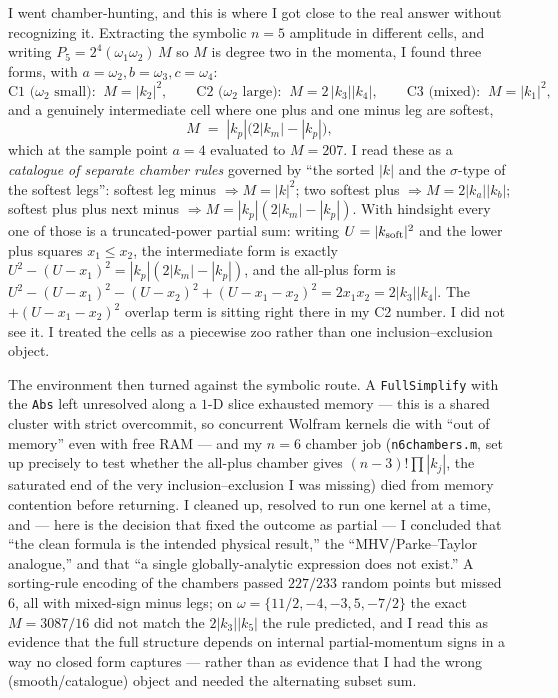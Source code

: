 \documentclass{article}
\begin{document}
I went chamber-hunting, and this is where I got close to the real answer without
recognizing it. Extracting the symbolic $n=5$ amplitude in different cells, and
writing $P_5=2^{4}(\omega_1\omega_2)\,M$ so $M$ is degree two in the momenta, I
found three forms, with $a=\omega_2,b=\omega_3,c=\omega_4$:
\[
\text{C1 ($\omega_2$ small):}\;\; M=|k_2|^2,\qquad
\text{C2 ($\omega_2$ large):}\;\; M=2\,|k_3||k_4|,\qquad
\text{C3 (mixed):}\;\; M=|k_1|^2,
\]
and a genuinely intermediate cell where one plus and one minus leg are softest,
\[
M \;=\; |k_p|\big(2|k_m|-|k_p|\big),
\]
which at the sample point $a=4$ evaluated to $M=207$. I read these as a
\emph{catalogue of separate chamber rules} governed by ``the sorted $|k|$ and the
$\sigma$-type of the softest legs'': softest leg minus $\Rightarrow M=|k|^2$; two
softest plus $\Rightarrow M=2|k_a||k_b|$; softest plus plus next minus
$\Rightarrow M=|k_p|(2|k_m|-|k_p|)$. With hindsight every one of those is a
truncated-power partial sum: writing $U=|k_{\rm soft}|^2$ and the lower plus
squares $x_1\le x_2$, the intermediate form is exactly
$U^2-(U-x_1)^2=|k_p|(2|k_m|-|k_p|)$, and the all-plus form is
$U^2-(U-x_1)^2-(U-x_2)^2+(U-x_1-x_2)^2=2x_1x_2=2|k_3||k_4|$. The
$+(U-x_1-x_2)^2$ overlap term is sitting right there in my C2 number. I did not
see it. I treated the cells as a piecewise zoo rather than one inclusion--exclusion
object.

The environment then turned against the symbolic route. A \texttt{FullSimplify}
with the \texttt{Abs} left unresolved along a $1$-D slice exhausted memory --- this
is a shared cluster with strict overcommit, so concurrent Wolfram kernels die
with ``out of memory'' even with free RAM --- and my $n=6$ chamber job
(\texttt{n6chambers.m}, set up precisely to test whether the all-plus chamber
gives $(n-3)!\prod|k_j|$, the saturated end of the very inclusion--exclusion I was
missing) died from memory contention before returning. I cleaned up, resolved to
run one kernel at a time, and --- here is the decision that fixed the outcome as
partial --- I concluded that ``the clean formula is the intended physical
result,'' the ``MHV/Parke--Taylor analogue,'' and that ``a single
globally-analytic expression does not exist.'' A sorting-rule encoding of the
chambers passed $227/233$ random points but missed $6$, all with mixed-sign minus
legs; on $\omega=\{11/2,-4,-3,5,-7/2\}$ the exact $M=3087/16$ did not match the
$2|k_3||k_5|$ the rule predicted, and I read this as evidence that the full
structure depends on internal partial-momentum signs in a way no closed form
captures --- rather than as evidence that I had the wrong (smooth/catalogue)
object and needed the alternating subset sum.
\end{document}
